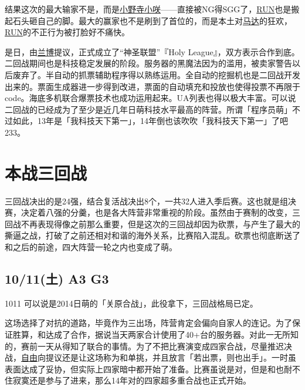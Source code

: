 结果这次的最大输家不是，而是\uline{小野寺小咲}——直接被NG得SGG了，\uline{RUN}也是搬起石头砸自己的脚。最大的赢家也不是刷到了首位的，而是本土对\uline{马达}的狂欢，\uline{RUN}的不正行为被打脸好不痛快。

是日，由\uline{兰博}提议，正式成立了“神圣联盟”『Holy League』，双方表示合作到底。
\\

二回战期间也是科技稳定发展的阶段。服务器的黑魔法因为的滥用，被卖家警告以后废弃了。半自动的抓票辅助程序得以熟练运用。全自动的挖掘机也是二回战开发出来的。票面生成器进一步得到改进，票面的自动填充和投放也使得投票不再限于code。海底多机联合爆票技术也成功运用起来。UA列表也得以极大丰富。可以说二回战的已经成为了至少是近几年日萌科技水平最高的阵营。所谓「程序员萌」不过如此，13年是「我科技天下第一」，14年倒也该吹吹「我科技天下第一」了吧233。

\chapter{本战三回战}

三回战决出的是24强，结合复活战决出8个，一共32人进入季后赛。这也就是组决赛，决定着八强的分羹，也是各大阵营非常重视的阶段。虽然由于赛制的改变，三回战不再表现得像之前那么重要，但是这次的三回战却因为砍票，与产生了最大的撕逼之战，打破了之前还相对和谐的海外关系，比赛陷入混乱。砍票也彻底断送了和之后的前途，四大阵营一轮之内也变成了萌。

\section{10/11(土) A3 G3}

1011 可以说是2014日萌的「关原合战」，此役拿下，三回战格局已定。



这场选择了对抗的道路，毕竟作为三出场，阵营肯定会偏向自家人的连记。为了保证胜算，和达成了合作，据说当天两家合计使用了40+台的服务器。对此一无所知的，赛前一天从得知了联合的事情。为了不把比赛演变成四家合战，尽量推迟决战，\uline{自由}向提议还是让这场称为和单挑，并且放言「若出票，则也出手」。一时虽表面达成了妥协，但实际上四家暗中都开始了准备。比赛虽说是对，但是和也耐不住寂寞还是参与了进来，那么14年对的四家超多重合战也正式开始。

